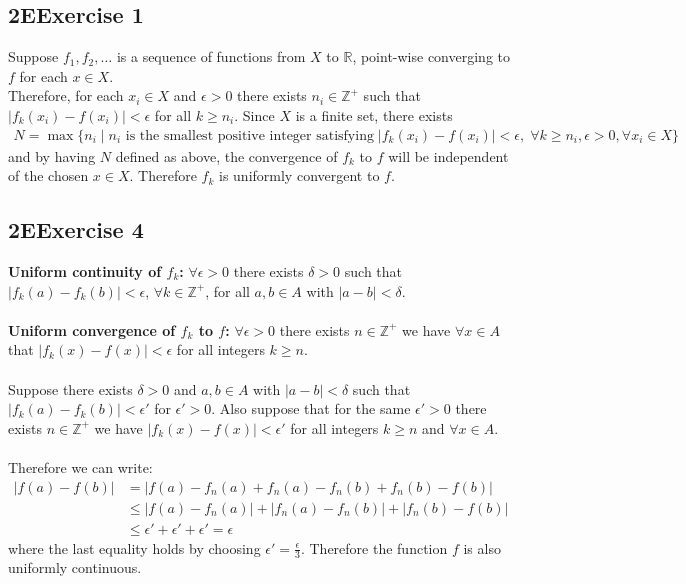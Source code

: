\documentclass[12pt, letterpaper]{article}
\newcommand{\Z}{\mathbb{Z}}
\newcommand{\R}{\mathbb{R}}
\begin{document}
\subsection*{2\hspace{1pt}E\hspace{20pt}Exercise 1}
Suppose $f_1, f_2, \dots$ is a sequence of functions from $X$ to $\R$, point-wise converging to $f$ for each $x\in X$.\\
Therefore, for each $x_i\in X$ and $\epsilon>0$ there exists $n_i\in\Z^+$ such that $|f_k(x_i)-f(x_i)|<\epsilon$ for all $k\geq n_i$. Since $X$ is a finite set, there exists
\begin{align*}
    N = \max\{n_i\;|\; n_i \text{ is the smallest positive integer satisfying}  \; |f_k(x_i)-f(x_i)|<\epsilon, \;\forall k\geq n_i, \epsilon>0, \forall x_i\in X\}
\end{align*} 
and by having $N$ defined as above, the convergence of $f_k$ to $f$ will be independent of the chosen $x\in X$. Therefore $f_k$ is uniformly convergent to $f$.
\clearpage

\subsection*{2\hspace{1pt}E\hspace{20pt}Exercise 4}
\textbf{Uniform continuity of $f_k$:} $\forall \epsilon>0$ there exists $\delta>0$ such that $|f_k(a)-f_k(b)|<\epsilon$, $\forall k\in \Z^+$, for all $a,b\in A$ with $|a-b|<\delta$.\\\\
\textbf{Uniform convergence of $f_k$ to $f$:} $\forall \epsilon>0$ there exists $n\in\Z^+$ we have $\forall x\in A$ that $|f_k(x)-f(x)|<\epsilon$ for all integers $k\geq n$.\\\\
Suppose there exists $\delta>0$ and $a,b\in A$ with $|a-b|<\delta$ such that $|f_k(a)-f_k(b)|<\epsilon'$ for $\epsilon'>0$. Also suppose that for the same $\epsilon'>0$ there exists $n\in\Z^+$ we have $|f_k(x)-f(x)|<\epsilon'$ for all integers $k\geq n$ and $\forall x\in A$.\\\\
Therefore we can write:
\begin{align*}
    |f(a)-f(b)|&=|f(a)-f_n(a)+f_n(a)-f_n(b)+f_n(b)-f(b)|\\
    &\leq |f(a)-f_n(a)|+|f_n(a)-f_n(b)|+|f_n(b)-f(b)|\\
    &\leq \epsilon'+\epsilon'+\epsilon'=\epsilon
\end{align*}
where the last equality holds by choosing $\epsilon'=\frac{\epsilon}{3}$. Therefore the function $f$ is also uniformly continuous.
\clearpage
\end{document}
